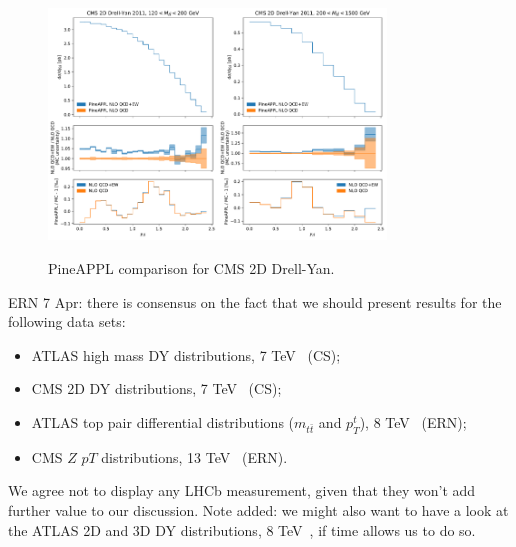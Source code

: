 \begin{figure}
    \includegraphics[width=0.4\textwidth]{figures/pineappl_CMSDY2D11_bin5}\includegraphics[width=0.4\textwidth]{figures/pineappl_CMSDY2D11_bin6}
    \caption{PineAPPL comparison for CMS 2D Drell-Yan.}
    \label{fig:cmsdy2d11}
\end{figure}

ERN 7 Apr: there is consensus on the fact that we should present results for the
following data sets:
\begin{itemize}
\item ATLAS high mass DY distributions, 7 TeV~\cite{Aad:2013iua} (CS);
\item CMS 2D DY distributions, 7 TeV~\cite{Chatrchyan:2013tia} (CS);
\item ATLAS top pair differential distributions ($m_{t\bar{t}}$ and $p_T^t$),
8 TeV~\cite{Aad:2015mbv} (ERN);
\item CMS $Z$ $pT$ distributions, 13 TeV~\cite{Sirunyan:2019bzr} (ERN).
\end{itemize}

We agree not to display any LHCb measurement, given that they won't add
further value to our discussion.
Note added: we might also want to have a look at the ATLAS 2D and 3D DY
distributions, 8 TeV~\cite{Aad:2016zzw,Aaboud:2017ffb}, if time allows
us to do so.

